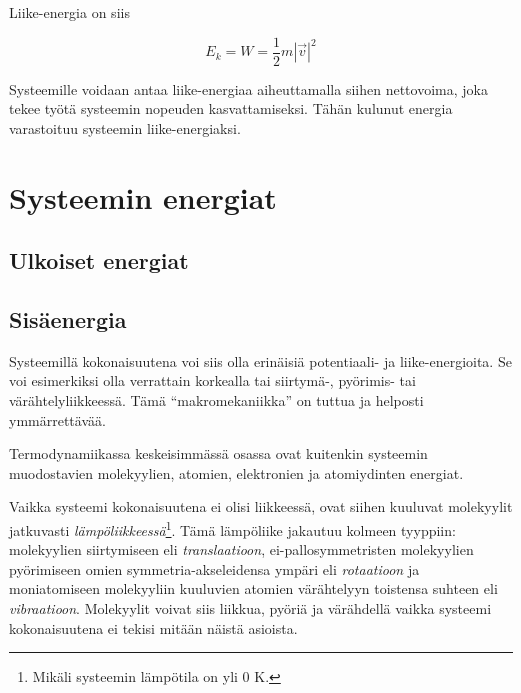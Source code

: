 \documentclass[12pt,a4paper,finnish]{book}
\begin{document}
Liike-energia on siis

\begin{equation}
 E_k = W = \frac{1}{2}m|\vec{v}|^2
\end{equation}

Systeemille voidaan antaa liike-energiaa aiheuttamalla siihen nettovoima, joka tekee työtä systeemin 
nopeuden kasvattamiseksi. Tähän kulunut energia varastoituu systeemin liike-energiaksi.


\chapter{Systeemin energiat} %

\section{Ulkoiset energiat} %

\section{Sisäenergia} %

Systeemillä kokonaisuutena voi siis olla erinäisiä potentiaali- ja liike-energioita. Se voi esimerkiksi olla verrattain korkealla 
tai siirtymä-, pyörimis- tai värähtelyliikkeessä. Tämä ``makromekaniikka'' on tuttua ja helposti ymmärrettävää.

Termodynamiikassa keskeisimmässä osassa ovat kuitenkin systeemin muodostavien molekyylien, atomien, elektronien ja atomiydinten 
energiat.

Vaikka systeemi kokonaisuutena ei olisi liikkeessä, ovat siihen kuuluvat molekyylit jatkuvasti 
\textit{lämpöliikkeessä}\footnote{Mikäli systeemin lämpötila on yli 0 K.}. Tämä lämpöliike jakautuu kolmeen tyyppiin: molekyylien 
siirtymiseen eli \textit{translaatioon}, ei-pallosymmetristen molekyylien pyörimiseen omien symmetria-akseleidensa ympäri eli 
\textit{rotaatioon} ja moniatomiseen molekyyliin kuuluvien atomien värähtelyyn toistensa suhteen eli \textit{vibraatioon}. 
Molekyylit voivat siis liikkua, pyöriä ja värähdellä vaikka systeemi kokonaisuutena ei tekisi mitään näistä asioista.
\end{document}
